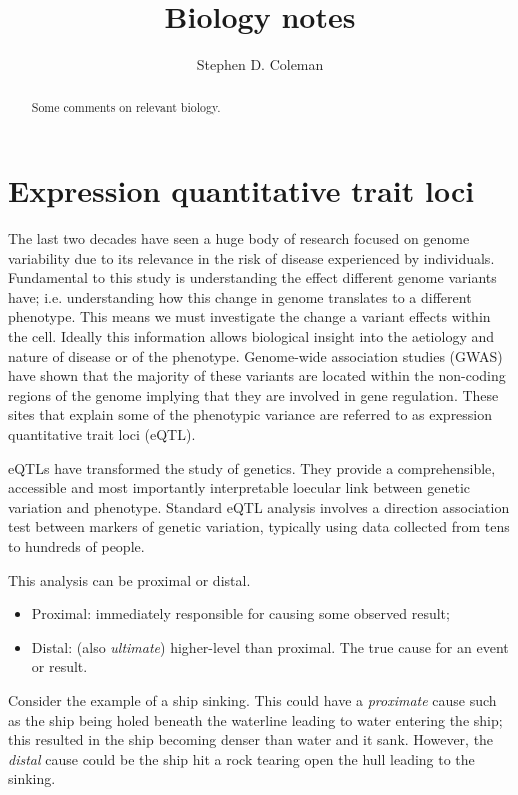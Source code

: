 \documentclass[a4paper,10pt]{article}
\title{Biology notes}
\author{Stephen D. Coleman}
\begin{document}
\maketitle

\begin{abstract}
Some comments on relevant biology.

\end{abstract}

\section{Expression quantitative trait loci}
The last two decades have seen a huge body of research focused on genome variability due to its 
relevance in the risk of disease experienced by individuals. Fundamental to this study is 
understanding the effect different genome variants have; i.e. understanding how this change 
in genome translates to a different phenotype. This means we must investigate the change a 
variant effects within the cell. Ideally this information allows biological insight into the 
aetiology and nature of disease or of the phenotype. Genome-wide association studies (GWAS) 
\cite{feero_genomewide_2010} have shown that the majority of these variants are located within 
the non-coding regions of the genome \cite{nica_expression_2013} implying that they are involved in gene regulation. These 
sites that explain some of the phenotypic variance are referred to as expression quantitative 
trait loci (eQTL).

eQTLs have transformed the study of genetics. They provide a comprehensible, accessible and 
most importantly interpretable loecular link between genetic variation and phenotype. Standard 
eQTL analysis involves a direction association test between markers of genetic variation, 
typically using data collected from tens to hundreds of people.

This analysis can be proximal or distal.
\begin{itemize}
 \item Proximal: immediately responsible for causing some observed result;
 \item Distal: (also \emph{ultimate}) higher-level than proximal. The true cause for an event or 
 result.
\end{itemize}
Consider the example of a ship sinking. This could have a \emph{proximate} cause such as the ship 
being holed beneath the waterline leading to water entering the ship; this resulted in the ship 
becoming denser than water and it sank. However, the \emph{distal} cause could be the ship hit a 
rock tearing open the hull leading to the sinking.
\end{document}

